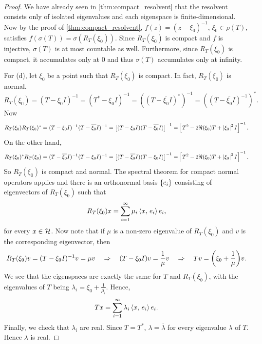 \begin{proof}
    We have already seen in \cref{thm:compact_resolvent} that the resolvent 
    consists only of isolated eigenvalues and each eigenspace is 
    finite-dimensional. Now by the proof of \cref{thm:compact_resolvent}, 
    $f(z) = (z-\xi_0)^{-1}$, $\xi_0\in\rho(T)$, satisfies 
    $f(\sigma(T)) = \sigma(R_T(\xi_0))$. Since $R_T(\xi_0)$ is compact 
    and $f$ is injective, $\sigma(T)$ is at most countable as well. 
    Furthermore, since $R_T(\xi_0)$ is compact, it accumulates only 
    at $0$ and thus $\sigma(T)$ accumulates only at infinity. 

    For (d), let $\xi_0$ be a point such that $R_T(\xi_0)$ is compact. 
    In fact, $R_T(\xi_0)$ is normal.
    \begin{equation*}
        R_T(\xi_0) = (T-\xi_0 I)^{-1} = (T^*-\xi_0 I)^{-1} 
        = ((T-\overline{\xi_0} I)^*)^{-1} = ((T-\overline{\xi_0} I)^{-1})^*.
    \end{equation*}
    Now 
    \begin{equation*}
        R_T(\xi_0)R_T(\xi_0)^* = (T-\xi_0 I)^{-1}(T-\overline{\xi_0} I)^{-1} 
        = \left[ {(T-\xi_0 I)(T-\overline{\xi_0} I)} \right]^{-1} 
        = \left[ {T^2 - 2\Re(\xi_0)T + \left\lvert {\xi_0} \right\rvert^2I} \right]^{-1}.
    \end{equation*}
    On the other hand, 
    \begin{equation*}
        R_T(\xi_0)^*R_T(\xi_0) = (T-\overline{\xi_0} I)^{-1}(T-\xi_0 I)^{-1} 
        = \left[ {(T-\overline{\xi_0} I)(T-\xi_0 I)} \right]^{-1} 
        = \left[ {T^2 - 2\Re(\xi_0)T + \left\lvert {\xi_0} \right\rvert^2I} \right]^{-1}.
    \end{equation*}
    So $R_T(\xi_0)$ is compact and normal. The spectral theorem for 
    compact normal operators applies and there is an orthonormal basis 
    $\left\{ {e_i} \right\}$ consisting of eigenvectors of $R_T(\xi_0)$ such that 
    \begin{equation*}
        R_T(\xi_0)x = \sum_{i=1}^\infty \mu_i\left\langle {x},\, {e_i} \right\rangle e_i,
    \end{equation*}
    for every $x\in\mathcal{H}$. Now note that if $\mu$ is a non-zero eigenvalue of 
    $R_T(\xi_0)$ and $v$ is the corresponding eigenvector, then 
    \begin{equation*}
        R_T(\xi_0)v = (T-\xi_0 I)^{-1}v = \mu v
        \quad\Rightarrow\quad
        (T-\xi_0 I)v = \frac{1}{\mu}v
        \quad\Rightarrow\quad
        Tv = \pth{\xi_0 + \frac{1}{\mu}}v.
    \end{equation*}
    We see that the eigenspaces are exactly the same for $T$ and 
    $R_T(\xi_0)$, with the eigenvalues of $T$ being $\lambda_i = \xi_0 + \frac{1}{\mu_i}$.
    Hence, 
    \begin{equation*}
        Tx = \sum_{i=1}^\infty \lambda_i\left\langle {x},\, {e_i} \right\rangle e_i.
    \end{equation*}
    Finally, we check that $\lambda_i$ are real. Since $T = T^*$, 
    $\lambda = \overline{\lambda}$ for every eigenvalue $\lambda$ of $T$. 
    Hence $\lambda$ is real.
\end{proof}

